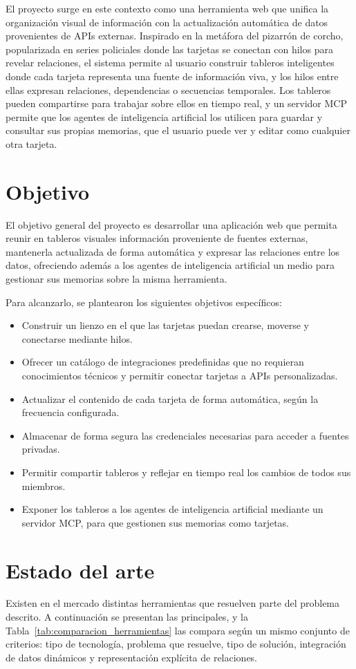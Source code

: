 El proyecto surge en este contexto como una herramienta web que unifica la organización visual de información con la actualización automática de datos provenientes de APIs externas. Inspirado en la metáfora del pizarrón de corcho, popularizada en series policiales donde las tarjetas se conectan con hilos para revelar relaciones, el sistema permite al usuario construir tableros inteligentes donde cada tarjeta representa una fuente de información viva, y los hilos entre ellas expresan relaciones, dependencias o secuencias temporales. Los tableros pueden compartirse para trabajar sobre ellos en tiempo real, y un servidor MCP permite que los agentes de inteligencia artificial los utilicen para guardar y consultar sus propias memorias, que el usuario puede ver y editar como cualquier otra tarjeta.

\section{Objetivo}
El objetivo general del proyecto es desarrollar una aplicación web que permita reunir en tableros visuales información proveniente de fuentes externas, mantenerla actualizada de forma automática y expresar las relaciones entre los datos, ofreciendo además a los agentes de inteligencia artificial un medio para gestionar sus memorias sobre la misma herramienta.

Para alcanzarlo, se plantearon los siguientes objetivos específicos:
\begin{itemize}
  \item Construir un lienzo en el que las tarjetas puedan crearse, moverse y conectarse mediante hilos.
  \item Ofrecer un catálogo de integraciones predefinidas que no requieran conocimientos técnicos y permitir conectar tarjetas a APIs personalizadas.
  \item Actualizar el contenido de cada tarjeta de forma automática, según la frecuencia configurada.
  \item Almacenar de forma segura las credenciales necesarias para acceder a fuentes privadas.
  \item Permitir compartir tableros y reflejar en tiempo real los cambios de todos sus miembros.
  \item Exponer los tableros a los agentes de inteligencia artificial mediante un servidor MCP, para que gestionen sus memorias como tarjetas.
\end{itemize}

\section{Estado del arte}
Existen en el mercado distintas herramientas que resuelven parte del problema descrito. A continuación se presentan las principales, y la Tabla~\ref{tab:comparacion_herramientas} las compara según un mismo conjunto de criterios: tipo de tecnología, problema que resuelve, tipo de solución, integración de datos dinámicos y representación explícita de relaciones.

